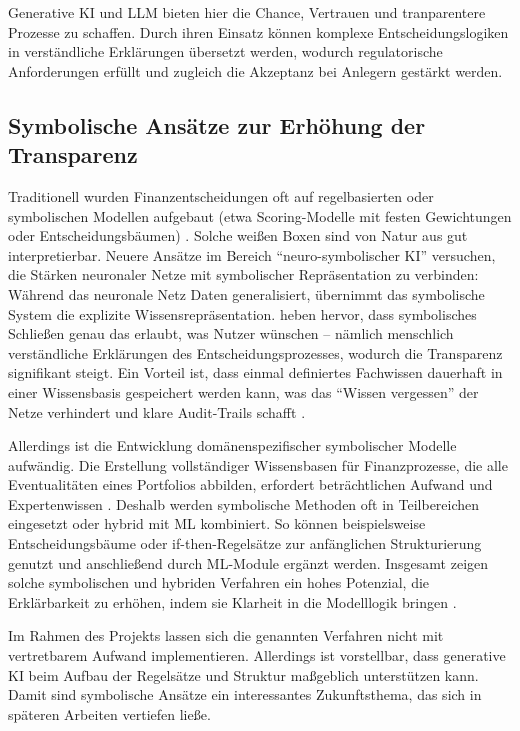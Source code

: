     Generative KI und \acs{LLM} bieten hier die Chance, Vertrauen und tranparentere Prozesse zu schaffen.
    Durch ihren Einsatz können komplexe Entscheidungslogiken in verständliche Erklärungen übersetzt werden, wodurch regulatorische Anforderungen erfüllt und zugleich die Akzeptanz bei Anlegern gestärkt werden.

  \subsection{Symbolische Ansätze zur Erhöhung der Transparenz}

    Traditionell wurden Finanzentscheidungen oft auf regelbasierten oder symbolischen Modellen aufgebaut (etwa Scoring-Modelle mit festen Gewichtungen oder Entscheidungsbäumen) \autocite[S. 2]{Yeo2025}.
    Solche weißen Boxen sind von Natur aus gut interpretierbar.
    Neuere Ansätze im Bereich \enquote{neuro-symbolischer KI} versuchen, die Stärken neuronaler Netze mit symbolischer Repräsentation zu verbinden:
    Während das neuronale Netz Daten generalisiert, übernimmt das symbolische System die explizite Wissensrepräsentation.
    \textcite{Yeo2025} heben hervor, dass symbolisches Schließen genau das erlaubt, was Nutzer wünschen – nämlich menschlich verständliche Erklärungen des Entscheidungsprozesses, wodurch die Transparenz signifikant steigt.
    Ein Vorteil ist, dass einmal definiertes Fachwissen dauerhaft in einer Wissensbasis gespeichert werden kann, was das \enquote{Wissen vergessen} der Netze verhindert und klare Audit-Trails schafft \autocite[S. 31]{Yeo2025}.

    Allerdings ist die Entwicklung domänenspezifischer symbolischer Modelle aufwändig.
    Die Erstellung vollständiger Wissensbasen für Finanzprozesse, die alle Eventualitäten eines Portfolios abbilden, erfordert beträchtlichen Aufwand und Expertenwissen \autocite[S. 28-31]{Yeo2025}.
    Deshalb werden symbolische Methoden oft in Teilbereichen eingesetzt oder hybrid mit \acs{ML} kombiniert.
    So können beispielsweise Entscheidungsbäume oder if-then-Regelsätze zur anfänglichen Strukturierung genutzt und anschließend durch \acs{ML}-Module ergänzt werden.
    Insgesamt zeigen solche symbolischen und hybriden Verfahren ein hohes Potenzial, die Erklärbarkeit zu erhöhen, indem sie Klarheit in die Modelllogik bringen \autocite[S. 31]{Yeo2025}.

    Im Rahmen des Projekts lassen sich die genannten Verfahren nicht mit vertretbarem Aufwand implementieren.
    Allerdings ist vorstellbar, dass generative KI beim Aufbau der Regelsätze und Struktur maßgeblich unterstützen kann.
    Damit sind symbolische Ansätze ein interessantes Zukunftsthema, das sich in späteren Arbeiten vertiefen ließe.

